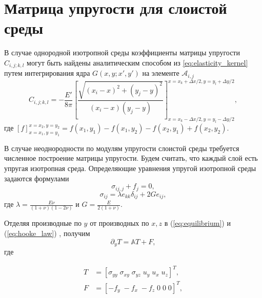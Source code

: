 \chapter{Матрица упругости для слоистой среды}
\label{ch:layered_elasticity}

В случае однородной изотропной среды коэффициенты матрицы упругости $C_{i,j;k,l}$ могут быть найдены аналитическим способом из \eqref{eq:elasticity_kernel} путем интегрирования ядра $G(x,y;x',y')$ на элементе $\mathcal{A}_{i,j}$ \cite{Peir2008}
\begin{equation}
    \label{eq:homogeneous_matrix}
    C_{i,j;k,l} = -\frac{E'}{8\pi} \left[\frac{\sqrt{(x_i\!-\!x)^2 + (y_j\!-\!y)^2}}{(x_i\!-\!x)(y_j\!-\!y)} \right]_{x=x_k-\Delta x/2, y=y_l-\Delta y/2}^{x=x_k+\Delta x/2, y=y_l+\Delta y/2},
\end{equation}
где $[f]_{x=x_1, y=y_1}^{x=x_2, y=y_2} = f(x_1,y_1) - f(x_1,y_2) - f(x_2,y_1) + f(x_2,y_2)$.

В случае неоднородности по модулям упругости слоистой среды требуется численное построение матрицы упругости. Будем считать, что каждый слой есть упругая изотропная среда. Определяющие уравнения упругой изотропной среды задаются формулами
\begin{equation}
    \label{eq:equilibrium}
    \sigma_{ij,j} + f_j = 0,
\end{equation}
\begin{equation}		
    \sigma_{ij} = \lambda e_{kk}\delta_{ij} + 2G e_{ij},
    \label{eq:hooke_law}
\end{equation}
где $\lambda = \frac{E \nu}{(1+\nu)(1-2\nu)}$ и $ G = \frac{E}{2(1+\nu)} $.

Отделяя производные по $y$ от производных по $x, z$ в (\ref{eq:equilibrium}) и (\ref{eq:hooke_law}) \cite{Siebrits_Peirce_2002,Peirce2001TheSF,Peirce2001UniformAA}, получим
\begin{equation}
    \label{eq:separate}
    \partial_{y} T = \mathbb{A}T + F,
\end{equation}
где

\begin{equation}
    \label{eq:T}
    \begin{split}
        T &= \left[\sigma_{yy} \; \sigma_{xy} \; \sigma_{yz} \; u_{y} \; u_{x} \; u_{z}\right]^T, \\
        F &= \left[-f_y \; -f_x \; -f_z \; 0 \; 0 \; 0\right]^T,
    \end{split}
\end{equation}


